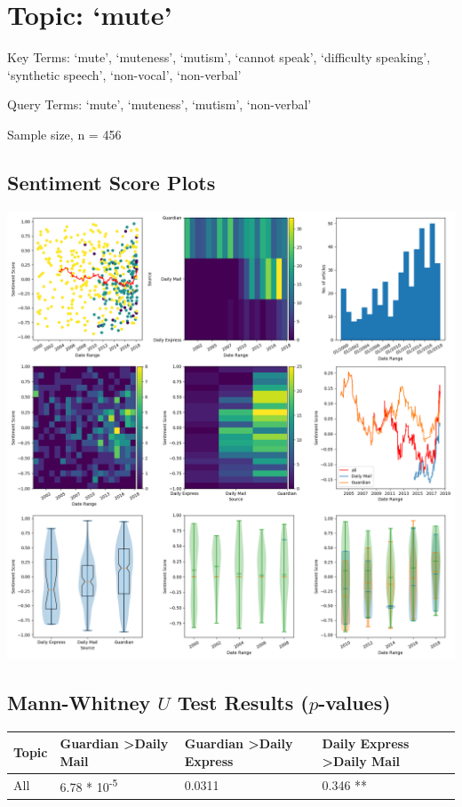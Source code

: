 \documentclass{report}
\begin{document}
\newpage
\section{Topic: `mute'}
Key Terms: `mute', `muteness', `mutism', `cannot speak', `difficulty speaking', `synthetic speech', `non-vocal', `non-verbal'

\noindent Query Terms: `mute', `muteness', `mutism', `non-verbal'

\noindent Sample size, n = 456

\subsection{Sentiment Score Plots}
\includegraphics[width=\textwidth]{raw/mute.png}

\subsection{Mann-Whitney $U$ Test Results ($p$-values)}
\noindent
\begin{tabu} to 1.0\textwidth { | X[c] | X[c] | X[c] | X[c] | }  
	\hline
	Topic & Guardian \textgreater\space Daily Mail & Guardian \textgreater\space Daily Express & Daily Express \textgreater\space Daily Mail  \\
	\hline
	All & 6.78 * 10\textsuperscript{-5} & 0.0311 & 0.346 **  \\
	\hline
\end{tabu}
\end{document}
